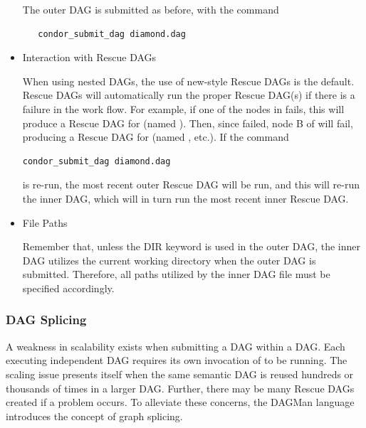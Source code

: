 \begin{itemize}
The outer DAG is submitted as before, with the command
\begin{verbatim}
   condor_submit_dag diamond.dag
\end{verbatim}

\item{Interaction with Rescue DAGs}

When using nested DAGs, the use of new-style Rescue DAGs is the default.  
Rescue DAGs will automatically run the proper Rescue DAG(s) if
there is a failure in the work flow.  For example, if one of the
nodes in  fails, this will produce a Rescue
DAG for  (named ).
Then,
since  failed, node B of  will fail,
producing a Rescue DAG for 
(named , etc.).  
If the command
\begin{verbatim}
condor_submit_dag diamond.dag
\end{verbatim}
is re-run, the most recent outer Rescue
DAG will be run, and this will re-run the inner DAG, which will
in turn run the most recent inner Rescue DAG.  

\item{File Paths}

Remember that, unless the DIR keyword is used in the outer DAG,
the inner DAG utilizes the current working directory when the outer DAG
is submitted.
Therefore, all paths utilized by the inner DAG file
must be specified accordingly.

\end{itemize}

\subsubsection{\label{sec:DAGSplicing}DAG Splicing}

A weakness in scalability exists when submitting a DAG within a DAG.
Each executing independent DAG requires its own invocation of
 to be running.
The scaling issue presents itself when
the same semantic DAG is reused hundreds or thousands of times
in a larger DAG.
Further, there may be many Rescue DAGs created if a problem occurs.
To alleviate these concerns, the DAGMan language introduces
the concept of graph splicing.


